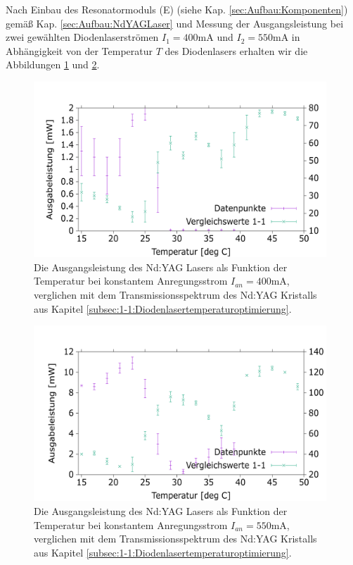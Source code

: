 \documentclass[../../main.tex]{subfiles}
\begin{document}
    
    Nach Einbau des Resonatormoduls (E) (siehe Kap. \ref{sec:Aufbau:Komponenten}) gemäß Kap. \ref{sec:Aufbau:NdYAGLaser} und Messung der Ausgangsleistung bei zwei gewählten Diodenlaserströmen $I_1 = 400\si{\mA}$ und $I_2 = 550\si{\mA}$ in Abhängigkeit von der Temperatur $T$ des Diodenlasers erhalten wir die Abbildungen \ref{fig:4:PowerOverTemperature_400mA_comp} und \ref{fig:4:PowerOverTemperature_550mA_comp}.


    \begin{figure}[H]
        \centering
        \includegraphics[width=11cm]{../../Bilddateien/4/PowerOverTemperature_400mA_comp.png}
        \caption{Die Ausgangsleistung des Nd:YAG Lasers als Funktion der Temperatur bei konstantem Anregungsstrom $I_{\textit{an}} = 400\si{\mA}$, verglichen mit dem Transmissionsspektrum des Nd:YAG Kristalls aus Kapitel \ref{subsec:1-1:Diodenlasertemperaturoptimierung}.}
        \label{fig:4:PowerOverTemperature_400mA_comp}
    \end{figure}

    \begin{figure}[H]
        \centering
        \includegraphics[width=11cm]{../../Bilddateien/4/PowerOverTemperature_550mA_comp.png}
        \caption{Die Ausgangsleistung des Nd:YAG Lasers als Funktion der Temperatur bei konstantem Anregungsstrom $I_{\textit{an}} = 550\si{\mA}$, verglichen mit dem Transmissionsspektrum des Nd:YAG Kristalls aus Kapitel \ref{subsec:1-1:Diodenlasertemperaturoptimierung}.}
        \label{fig:4:PowerOverTemperature_550mA_comp}
    \end{figure}
\end{document}

